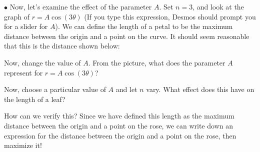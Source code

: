 \documentclass{ximera}
\begin{document}
\begin{exercise}
\begin{exercise}
$\bullet$ Now, let's examine the effect of the parameter $A$.  Set $n=3$, and look at the graph of $r=A \cos(3\theta)$ (If you type this expression, Desmos should prompt you for a slider for $A$).  We can define the length of a petal to be the maximum distance between the origin and a point on the curve.  It should seem reasonable that this is the distance shown below:

\begin{image}  
\end{image} 

Now, change the value of $A$.  From the picture, what does the parameter $A$ represent for $r=A\cos(3 \theta)$?

\begin{multipleChoice}
\end{multipleChoice}

Now, choose a particular value of $A$ and let $n$ vary.  What effect does this have on the length of a leaf?

\begin{multipleChoice}
\end{multipleChoice}

How can we verify this?  Since we have defined this length as the maximum distance between the origin and a point on the rose, we can write down an expression for the distance between the origin and a point on the rose, then maximize it!


\end{exercise}
\end{exercise}
\end{document}
